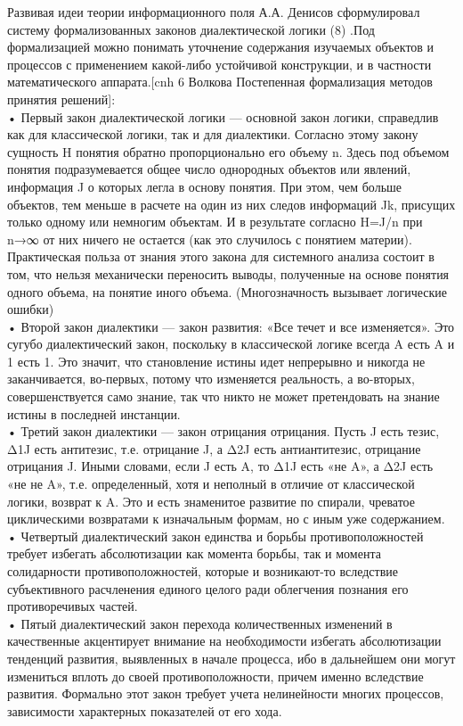 \documentclass[a4paper,12pt]{report}
\begin{document}
	Развивая идеи теории информационного поля А.А. Денисов сформулировал систему формализованных законов диалектической логики (8) .Под формализацией можно понимать уточнение содержания изучаемых объектов и процессов с применением какой-либо устойчивой конструкции, и в частности
математического аппарата.[cnh 6 Волкова Постепенная формализация методов принятия решений]:\\
    • Первый закон диалектической логики — основной закон логики, справедлив как для классической логики, так и для диалектики. Согласно этому закону сущность H понятия обратно пропорционально его объему n. Здесь под объемом понятия подразумевается общее число однородных объектов или явлений, информация J о которых легла в основу понятия. При этом, чем больше объектов, тем меньше в расчете на один из них следов информаций Jk, присущих только одному или немногим объектам. И в результате согласно H=J/n при n→∞ от них ничего не остается (как это случилось с понятием материи).
Практическая польза от знания этого закона для системного анализа состоит в том, что нельзя механически переносить выводы, полученные на основе понятия одного объема, на понятие иного объема. (Многозначность вызывает логические ошибки)\\
    • Второй закон диалектики — закон развития: «Все течет и все изменяется». Это сугубо диалектический закон, поскольку в классической логике всегда A есть A и 1 есть 1. Это значит, что становление истины идет непрерывно и никогда не заканчивается, во-первых, потому что изменяется реальность, а во-вторых, совершенствуется само знание, так что никто не может претендовать на знание истины в последней инстанции.\\
    • Третий закон диалектики — закон отрицания отрицания. Пусть J есть тезис, Δ1J есть антитезис, т.е. отрицание J, а Δ2J есть антиантитезис, отрицание отрицания J. Иными словами, если J есть A, то Δ1J есть «не A», а Δ2J есть «не не A», т.е. определенный, хотя и неполный в отличие от классической логики, возврат к A. Это и есть знаменитое развитие по спирали, чреватое циклическими возвратами к изначальным формам, но с иным уже содержанием.\\
    • Четвертый диалектический закон единства и борьбы противоположностей требует избегать абсолютизации как момента борьбы, так и момента солидарности противоположностей, которые и возникают-то вследствие субъективного расчленения единого целого ради облегчения познания его противоречивых частей.\\
    • Пятый диалектический закон перехода количественных изменений в качественные акцентирует внимание на необходимости избегать абсолютизации тенденций развития, выявленных в начале процесса, ибо в дальнейшем они могут измениться вплоть до своей противоположности, причем именно вследствие развития. Формально этот закон требует учета нелинейности многих процессов, зависимости характерных показателей от его хода.
\end{document}
